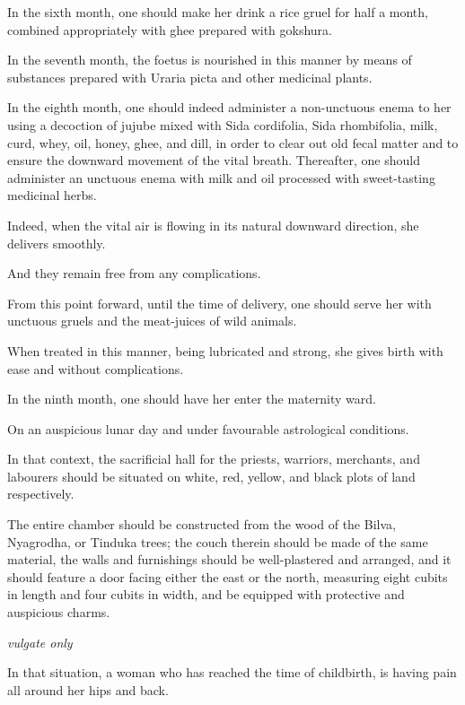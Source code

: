 \begin{translation}
\begin{tt}
In the sixth month, one should make her drink a rice gruel for half a
month, combined appropriately with ghee prepared with gokshura.

In the seventh month, the foetus is nourished in this manner by means of
substances prepared with Uraria picta and other medicinal plants.

In the eighth month, one should indeed administer a non-unctuous enema
to her using a decoction of jujube mixed with Sida cordifolia, Sida
rhombifolia, milk, curd, whey, oil, honey, ghee, and dill, in order to
clear out old fecal matter and to ensure the downward movement of the
vital breath. Thereafter, one should administer an unctuous enema with
milk and oil processed with sweet-tasting medicinal herbs.

Indeed, when the vital air is flowing in its natural downward direction,
she delivers smoothly.

And they remain free from any complications.

From this point forward, until the time of delivery, one should serve
her with unctuous gruels and the meat-juices of wild animals.

When treated in this manner, being lubricated and strong, she gives
birth with ease and without complications.

\item[5]

In the ninth month, one should have her enter the maternity ward.

On an auspicious lunar day and under favourable astrological
conditions.

In that context, the sacrificial hall for the priests, warriors,
merchants, and labourers should be situated on white, red, yellow, and
black plots of land respectively.

The entire chamber should be constructed from the wood of the Bilva,
Nyagrodha, or Tinduka trees; the couch therein should be made of the
same material, the walls and furnishings should be well-plastered and
arranged, and it should feature a door facing either the east or the
north, measuring eight cubits in length and four cubits in width, and be
equipped with protective and auspicious charms.

\item[6] \emph{vulgate only}

\item[7]

In that situation, a woman who has reached the time of childbirth, is
having pain all around her hips and back.


\end{tt}
\end{translation}

